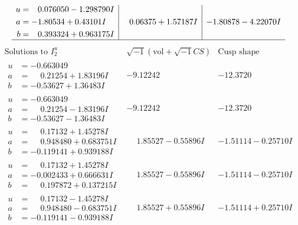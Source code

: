 \documentclass[1p]{elsarticle_modified}
\theoremstyle{definition}
\newcommand{\I}{\sqrt{-1}}
\begin{document}
$$\begin{array}{c|c|c}
\begin{aligned}
u &= \phantom{-}0.076050 - 1.298790 I \\
a &= -1.80534 + 0.43101 I \\
b &= \phantom{-}0.393324 + 0.963175 I\end{aligned}
 & \phantom{-}0.06375 + 1.57187 I & -1.80878 - 4.22070 I\\
 \hline 
 \end{array}$$\newpage$$\begin{array}{c|c|c}  
\text{Solutions to }I^u_{2}& \I (\text{vol} + \sqrt{-1}CS) & \text{Cusp shape}\\
 \hline 
\begin{aligned}
u &= -0.663049\phantom{ +0.000000I} \\
a &= \phantom{-}0.21254 + 1.83196 I \\
b &= -0.53627 + 1.36483 I\end{aligned}
 & -9.12242\phantom{ +0.000000I} & -12.3720\phantom{ +0.000000I} \\ \hline\begin{aligned}
u &= -0.663049\phantom{ +0.000000I} \\
a &= \phantom{-}0.21254 - 1.83196 I \\
b &= -0.53627 - 1.36483 I\end{aligned}
 & -9.12242\phantom{ +0.000000I} & -12.3720\phantom{ +0.000000I} \\ \hline\begin{aligned}
u &= \phantom{-}0.17132 + 1.45278 I \\
a &= \phantom{-}0.948480 + 0.683751 I \\
b &= -0.119141 + 0.939188 I\end{aligned}
 & \phantom{-}1.85527 - 0.55896 I & -1.51114 - 0.25710 I \\ \hline\begin{aligned}
u &= \phantom{-}0.17132 + 1.45278 I \\
a &= -0.002433 + 0.666631 I \\
b &= \phantom{-}0.197872 + 0.137215 I\end{aligned}
 & \phantom{-}1.85527 - 0.55896 I & -1.51114 - 0.25710 I \\ \hline\begin{aligned}
u &= \phantom{-}0.17132 - 1.45278 I \\
a &= \phantom{-}0.948480 - 0.683751 I \\
b &= -0.119141 - 0.939188 I\end{aligned}
 & \phantom{-}1.85527 + 0.55896 I & -1.51114 + 0.25710 I \\ \hline\begin{aligned}

\end{aligned}
\end{array}$$
\end{document}
